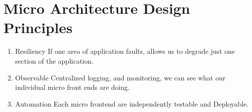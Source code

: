\section{Micro Architecture Design Principles}
\begin{enumerate}

  \item Resiliency 
If one area of application faults, allows us to degrade just one section of the application. 
  \item Observable 
Centralized logging, and monitoring, we can see what our individual micro front ends are doing.
  \item Automation 
Each micro frontend are independently testable and Deployable. 
\end{enumerate}